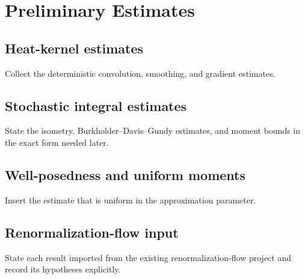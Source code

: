 \section{Preliminary Estimates}

\subsection{Heat-kernel estimates}

\begin{draftnote}
Collect the deterministic convolution, smoothing, and gradient estimates.
\end{draftnote}

\subsection{Stochastic integral estimates}

\begin{draftnote}
State the isometry, Burkholder--Davis--Gundy estimates, and moment bounds in
the exact form needed later.
\end{draftnote}

\subsection{Well-posedness and uniform moments}

\begin{proposition}
Insert the estimate that is uniform in the approximation parameter.
\end{proposition}

\subsection{Renormalization-flow input}

\begin{draftnote}
State each result imported from the existing renormalization-flow project and
record its hypotheses explicitly.
\end{draftnote}
